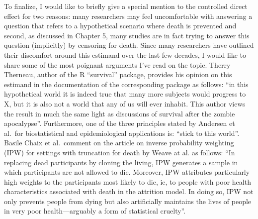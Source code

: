 \documentclass[
]{book}
\begin{document}
To finalize, I would like to briefly give a special mention to the controlled direct effect for two reasons: many researchers may feel uncomfortable with answering a question that refers to a hypothetical scenario where death is prevented and second, as discussed in Chapter 5, many studies are in fact trying to answer this question (implicitly) by censoring for death. Since many researchers have outlined their discomfort around this estimand over the last few decades, I would like to share some of the most poignant arguments I've read on the topic. Therry Therneau, author of the R ``survival'' package, provides his opinion on this estimand in the documentation of the corresponding package as follows: ``in this hypothetical world it is indeed true that many more subjects would progress to X, but it is also not a world that any of us will ever inhabit. This author views the result in much the same light as discussions of survival after the zombie apocalypse''\autocite{therneau2021}. Furthermore, one of the three principles stated by Andersen et al.~for biostatistical and epidemiological applications is: ``stick to this world''\autocite{andersen2012}. Basile Chaix et al.~comment on the article on inverse probability weighting (IPW) for settings with truncation for death by Weave at al.\autocite{weuve2012} as follows: ``In replacing dead participants by cloning the living, IPW generates a sample in which participants are not allowed to die. Moreover, IPW attributes particularly high weights to the participants most likely to die, ie, to people with poor health characteristics associated with death in the attrition model. In doing so, IPW not only prevents people from dying but also artificially maintains the lives of people in very poor health---arguably a form of statistical cruelty''\autocite{chaix2012}.
\end{document}
